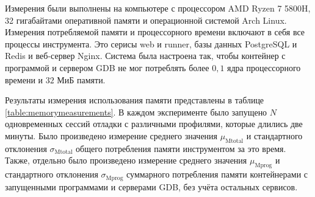 \documentclass[a4paper,article,14pt]{extarticle}
\begin{document}
Измерения были выполнены на компьютере с процессором AMD Ryzen 7 5800H, 32 гигабайтами оперативной памяти и операционной системой Arch Linux. Измерения потребляемой памяти и процессорного времени включают в себя все процессы инструмента. Это серисы web и runner, базы данных PostgreSQL и Redis и веб-сервер Nginx. Система была настроена так, чтобы контейнер с программой и сервером GDB не мог потреблять более $0{,}1$ ядра процессорного времени и $32$ МиБ памяти.

Результаты измерения использования памяти представлены в таблице \ref{table:memorymeasurements}. В каждом эксперименте было запущено $N$ одновременных сессий отладки с различными профилями, которые длились две минуты. Было произведено измерение среднего значения $\mu_\mathrm{Mtotal}$ и стандартного отклонения $\sigma_\mathrm{Mtotal}$ общего потребления памяти инструментом за это время. Также, отдельно было произведено измерение среднего значения $\mu_{\mathrm{Mprog}}$ и стандартного отклонения $\sigma_\mathrm{Mprog}$ суммарного потребления памяти контейнерами с запущенными программами и серверами GDB, без учёта остальных сервисов.
\end{document}
